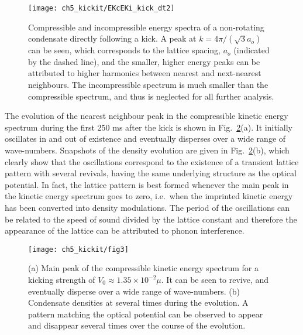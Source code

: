 \begin{figure}[tb]
    \centering
    \texttt{[image: ch5\_kickit/EKcEKi\_kick\_dt2]}
    \caption[Time-averaged compressible and incompressible energy spectra of a non-rotating condensate directly following a kick.]{Compressible and incompressible energy spectra of a non-rotating condensate directly following a kick. A peak at $k=4\pi/(\sqrt{3}a_o)$ can be seen, which corresponds to the lattice spacing, $a_o$ (indicated by the dashed line), and the smaller, higher energy peaks can be attributed to higher harmonics between nearest and next-nearest neighbours. The incompressible spectrum is much smaller than the compressible spectrum, and thus is neglected for all further analysis.}
    \label{fig:ekc_eki_novtx}
\end{figure}


The evolution of the nearest neighbour peak in the compressible kinetic energy spectrum during the first 250 ms after the kick is shown in Fig.~\ref{fig:novtx_p5k}(a). It initially oscillates in and out of existence and eventually disperses over a wide range of wave-numbers. Snapshots of the density evolution are given in Fig.~\ref{fig:novtx_p5k}(b), which clearly show that the oscillations correspond to the existence of a transient lattice pattern with several revivals, having the same underlying structure as the optical potential. In fact, the lattice pattern is best formed whenever the main peak in the kinetic energy spectrum goes to zero, i.e.~when the imprinted kinetic energy has been converted into density modulations. The period of the oscillations can be related to the speed of sound divided by the lattice constant and therefore the appearance of the lattice can be attributed to phonon interference.

\begin{figure}[tb]
    \centering

	\texttt{[image: ch5\_kickit/fig3]}
	\caption[Effect of kicking on non-rotating condensate.]{(a) Main peak of the compressible kinetic energy spectrum for a kicking strength of $V_0 \approx 1.35\times10^{-2}\mu$. It can be seen to revive, and eventually disperse over a wide range of wave-numbers.  (b) Condensate densities at several times during the evolution. A pattern matching the optical potential can be observed to appear and disappear several times over the course of the evolution.}
	\label{fig:novtx_p5k}
\end{figure}


